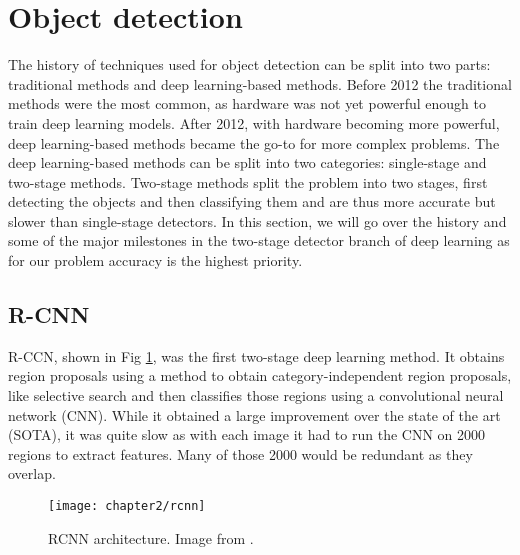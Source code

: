 

\section{Object detection}
The history of techniques used for object detection can be split into two parts: traditional methods and deep learning-based methods. Before 2012 the traditional methods were the most common, as hardware was not yet powerful enough to train deep learning models. After 2012, with hardware becoming more powerful, deep learning-based methods became the go-to for more complex problems. The deep learning-based methods can be split into two categories: single-stage and two-stage methods. Two-stage methods split the problem into two stages, first detecting the objects and then classifying them and are thus more accurate but slower than single-stage detectors. In this section, we will go over the history and some of the major milestones in the two-stage detector branch of deep learning as for our problem accuracy is the highest priority.

\subsection{R-CNN \cite{rcnn}}
R-CCN, shown in Fig \ref{fig:2_rcnn}, was the first two-stage deep learning method. It obtains region proposals using a method to obtain category-independent region proposals, like selective search \cite{selectivesearch} and then classifies those regions using a convolutional neural network (CNN). While it obtained a large improvement over the state of the art (SOTA), it was quite slow as with each image it had to run the CNN on 2000 regions to extract features. Many of those 2000 would be redundant as they overlap.

\begin{figure}[H]
	\centering
	\texttt{[image: chapter2/rcnn]}
	\caption{\label{fig:2_rcnn} RCNN architecture. Image from \citet{rcnn}.}
\end{figure}


